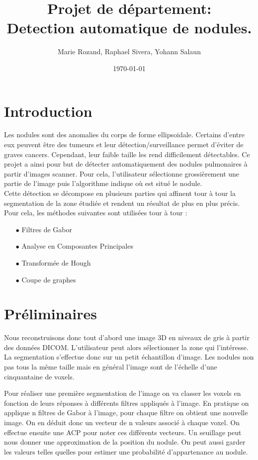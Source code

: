 \documentclass{article}
\title{Projet de département: \\ Detection automatique de nodules.}
\author{Marie Rozand, Raphael Sivera, Yohann Salaun}
\date{\today}
\begin{document}
\maketitle

\section*{Introduction}

Les nodules sont des anomalies du corps de forme ellipsoidale. Certains d'entre eux peuvent être des tumeurs et leur détection/surveillance permet d'éviter de graves cancers. Cependant, leur faible taille les rend difficilement détectables. Ce projet a ainsi pour but de détecter automatiquement des nodules pulmonaires à partir d'images scanner. Pour cela, l'utilisateur sélectionne grossièrement une partie de l'image puis l'algorithme indique où est situé le nodule. \\
Cette détection se décompose en plusieurs parties qui affinent tour à tour la segmentation de la zone étudiée et rendent un résultat de plus en plus précis. Pour cela, les méthodes suivantes sont utilisées tour à tour :
\begin{itemize}
	\item[$\bullet$]Filtres de Gabor
	\item[$\bullet$]Analyse en Composantes Principales
	\item[$\bullet$]Transformée de Hough
	\item[$\bullet$]Coupe de graphes
\end{itemize}



\section{Préliminaires}

Nous reconstruisons donc tout d'abord une image 3D en niveaux de gris à partir des données DICOM. L'utilisateur peut alors sélectionner la zone qui l'intéresse. 
La segmentation s'effectue donc sur un petit échantillon d'image. Les nodules non pas tous la même taille mais en général l'image sont de l'échelle d'une cinquantaine de voxels.

Pour réaliser une première segmentation de l'image on va classer les voxels en fonction de leurs réponses à différents filtres appliqués à l'image. En pratique on applique n filtres de Gabor à l'image, pour chaque filtre on obtient une nouvelle image. On en déduit donc un vecteur de n valeurs associé à chaque voxel. On effectue ensuite une ACP pour noter ces différents vecteurs.
Un seuillage peut nous donner une approximation de la position du nodule. On peut aussi garder les valeurs telles quelles pour estimer une probabilité d'appartenance au nodule.  
\end{document}
